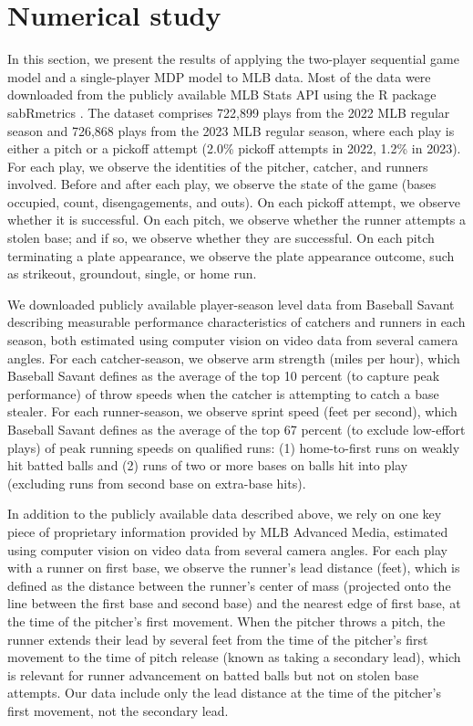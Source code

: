 \documentclass[opre,dblanonrev]{informs4}
\begin{document}
  \section{Numerical study}
  \label{sec:results}

    In this section, we present the results of applying the two-player sequential game model and a single-player MDP model to MLB data. Most of the data were downloaded from the publicly available MLB Stats API using the R package sabRmetrics \citep{powers_sabrmetrics_2025}. The dataset comprises 722,899 plays from the 2022 MLB regular season and 726,868 plays from the 2023 MLB regular season, where each play is either a pitch or a pickoff attempt (2.0\% pickoff attempts in 2022, 1.2\% in 2023). For each play, we observe the identities of the pitcher, catcher, and runners involved. Before and after each play, we observe the state of the game (bases occupied, count, disengagements, and outs). On each pickoff attempt, we observe whether it is successful. On each pitch, we observe whether the runner attempts a stolen base; and if so, we observe whether they are successful. On each pitch terminating a plate appearance, we observe the plate appearance outcome, such as strikeout, groundout, single, or home run.

    We downloaded publicly available player-season level data from Baseball Savant \citep{baseball_savant_statcast_2024} describing measurable performance characteristics of catchers and runners in each season, both estimated using computer vision on video data from several camera angles. For each catcher-season, we observe arm strength (miles per hour), which Baseball Savant defines as the average of the top 10 percent (to capture peak performance) of throw speeds when the catcher is attempting to catch a base stealer. For each runner-season, we observe sprint speed (feet per second), which Baseball Savant defines as the average of the top 67 percent (to exclude low-effort plays) of peak running speeds on qualified runs: (1) home-to-first runs on weakly hit batted balls and (2) runs of two or more bases on balls hit into play (excluding runs from second base on extra-base hits).

    In addition to the publicly available data described above, we rely on one key piece of proprietary information provided by MLB Advanced Media, estimated using computer vision on video data from several camera angles. For each play with a runner on first base, we observe the runner's lead distance (feet), which is defined as the distance between the runner's center of mass (projected onto the line between the first base and second base) and the nearest edge of first base, at the time of the pitcher's first movement. When the pitcher throws a pitch, the runner extends their lead by several feet from the time of the pitcher's first movement to the time of pitch release (known as taking a secondary lead), which is relevant for runner advancement on batted balls but not on stolen base attempts. Our data include only the lead distance at the time of the pitcher's first movement, not the secondary lead.
\end{document}
